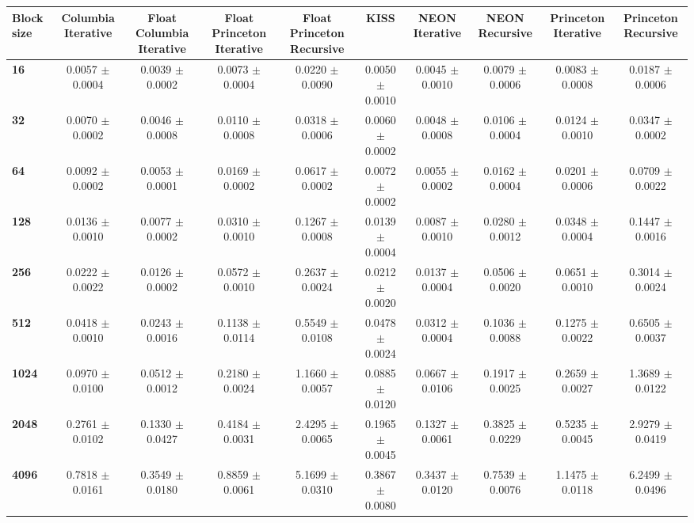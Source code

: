 \begin{tabular}{lccccccccc}\toprule
\textbf{Block size}  & \textbf{Columbia Iterative} & \textbf{Float Columbia Iterative} & \textbf{Float Princeton Iterative} & \textbf{Float Princeton Recursive} & \textbf{KISS} & \textbf{NEON Iterative} & \textbf{NEON Recursive} & \textbf{Princeton Iterative} & \textbf{Princeton Recursive}\\\midrule
\textbf{16}  & 0.0057 $\pm$ 0.0004 & 0.0039 $\pm$ 0.0002 & 0.0073 $\pm$ 0.0004 & 0.0220 $\pm$ 0.0090 & 0.0050 $\pm$ 0.0010 & 0.0045 $\pm$ 0.0010 & 0.0079 $\pm$ 0.0006 & 0.0083 $\pm$ 0.0008 & 0.0187 $\pm$ 0.0006\\
\textbf{32}  & 0.0070 $\pm$ 0.0002 & 0.0046 $\pm$ 0.0008 & 0.0110 $\pm$ 0.0008 & 0.0318 $\pm$ 0.0006 & 0.0060 $\pm$ 0.0002 & 0.0048 $\pm$ 0.0008 & 0.0106 $\pm$ 0.0004 & 0.0124 $\pm$ 0.0010 & 0.0347 $\pm$ 0.0002\\
\textbf{64}  & 0.0092 $\pm$ 0.0002 & 0.0053 $\pm$ 0.0001 & 0.0169 $\pm$ 0.0002 & 0.0617 $\pm$ 0.0002 & 0.0072 $\pm$ 0.0002 & 0.0055 $\pm$ 0.0002 & 0.0162 $\pm$ 0.0004 & 0.0201 $\pm$ 0.0006 & 0.0709 $\pm$ 0.0022\\
\textbf{128}  & 0.0136 $\pm$ 0.0010 & 0.0077 $\pm$ 0.0002 & 0.0310 $\pm$ 0.0010 & 0.1267 $\pm$ 0.0008 & 0.0139 $\pm$ 0.0004 & 0.0087 $\pm$ 0.0010 & 0.0280 $\pm$ 0.0012 & 0.0348 $\pm$ 0.0004 & 0.1447 $\pm$ 0.0016\\
\textbf{256}  & 0.0222 $\pm$ 0.0022 & 0.0126 $\pm$ 0.0002 & 0.0572 $\pm$ 0.0010 & 0.2637 $\pm$ 0.0024 & 0.0212 $\pm$ 0.0020 & 0.0137 $\pm$ 0.0004 & 0.0506 $\pm$ 0.0020 & 0.0651 $\pm$ 0.0010 & 0.3014 $\pm$ 0.0024\\
\textbf{512}  & 0.0418 $\pm$ 0.0010 & 0.0243 $\pm$ 0.0016 & 0.1138 $\pm$ 0.0114 & 0.5549 $\pm$ 0.0108 & 0.0478 $\pm$ 0.0024 & 0.0312 $\pm$ 0.0004 & 0.1036 $\pm$ 0.0088 & 0.1275 $\pm$ 0.0022 & 0.6505 $\pm$ 0.0037\\
\textbf{1024}  & 0.0970 $\pm$ 0.0100 & 0.0512 $\pm$ 0.0012 & 0.2180 $\pm$ 0.0024 & 1.1660 $\pm$ 0.0057 & 0.0885 $\pm$ 0.0120 & 0.0667 $\pm$ 0.0106 & 0.1917 $\pm$ 0.0025 & 0.2659 $\pm$ 0.0027 & 1.3689 $\pm$ 0.0122\\
\textbf{2048}  & 0.2761 $\pm$ 0.0102 & 0.1330 $\pm$ 0.0427 & 0.4184 $\pm$ 0.0031 & 2.4295 $\pm$ 0.0065 & 0.1965 $\pm$ 0.0045 & 0.1327 $\pm$ 0.0061 & 0.3825 $\pm$ 0.0229 & 0.5235 $\pm$ 0.0045 & 2.9279 $\pm$ 0.0419\\
\textbf{4096}  & 0.7818 $\pm$ 0.0161 & 0.3549 $\pm$ 0.0180 & 0.8859 $\pm$ 0.0061 & 5.1699 $\pm$ 0.0310 & 0.3867 $\pm$ 0.0080 & 0.3437 $\pm$ 0.0120 & 0.7539 $\pm$ 0.0076 & 1.1475 $\pm$ 0.0118 & 6.2499 $\pm$ 0.0496\\

\end{tabular}
